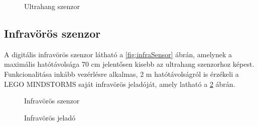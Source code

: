 \begin{figure}[!htb]
	\label{fig:ultrasonicSensor}
	\centering
	\caption{Ultrahang szenzor}
\end{figure}

\subsection{Infravörös szenzor}
A digitális infravörös szenzor látható a \ref{fig:infraSensor} ábrán, amelynek a maximális hatótávolsága 70 cm jelentősen kisebb az ultrahang szenzorhoz képest. Funkcionalitása inkább vezérlésre alkalmas, 2 m hatótávolságról is érzékeli a LEGO MINDSTORMS saját infravörös jeladóját, amely latható a \ref{fig:beacon} ábrán.

\begin{figure}[!htb]
	\centering
	\label{fig:infraSensor}
	\caption{Infravörös szenzor}
	\endminipage
	\label{fig:beacon}
	\caption{Infravörös jeladó}
	\endminipage
\end{figure}